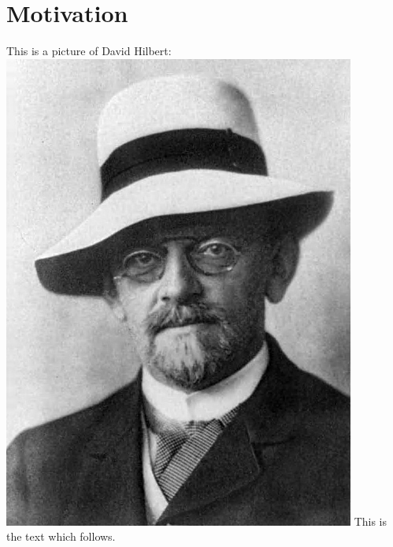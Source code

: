 \section{Motivation}

This is a picture of David
Hilbert:\includegraphics[scale=0.2,angle=90]{../img/hilbert.jpg} This is the text
which follows.



